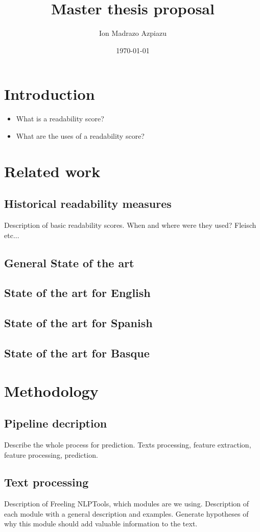 \documentclass[12pt]{article}
\title{Master thesis proposal}
\author{Ion Madrazo Azpiazu}
\date{\today}
\begin{document}
\maketitle
\section{Introduction}
\begin{itemize}
\item What is a readability score?
\item What are the uses of a readability score?

\end{itemize}
\section{Related work}
\subsection{Historical readability measures}
Description of basic readability scores. When and where were they used? Fleisch etc...
\subsection{General State of the art}

\subsection{State of the art for English}
\subsection{State of the art for Spanish}
\subsection{State of the art for Basque}



\section{Methodology}
\subsection{Pipeline decription}
Describe the whole process for prediction. Texts processing, feature extraction, feature processing, prediction.

\subsection{Text processing}
Description of Freeling NLPTools, which modules are we using. Description of each module with a general description and examples. Generate hypotheses of why this module should add valuable information to the text.
\end{document}
